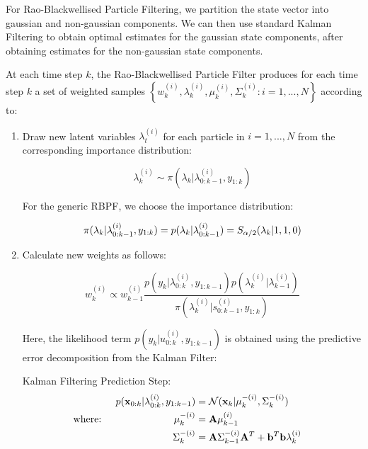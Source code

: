 \documentclass[../main.tex]{subfiles}
\begin{document}
For Rao-Blackwellised Particle Filtering, we partition the state vector into gaussian and non-gaussian components. We can then use standard Kalman Filtering to obtain optimal estimates for the gaussian state components, after obtaining estimates for the non-gaussian state components.  


At each time step $k$, the Rao-Blackwellised Particle Filter produces for each time step $k$ a set of weighted samples $\left\{ w_k^{(i)}, \lambda_k^{(i)}, \mu_k^{(i)}, \Sigma_k^{(i)} : i = 1,...,N \right\}$ according to: 


\begin{enumerate}
	\item Draw new latent variables $\lambda_t^{(i)}$ for each particle in $i = 1,...,N$ from the corresponding importance distribution: 
	
	\begin{equation}
		\lambda_k^{(i)} \sim \pi(\lambda_k | \lambda_{0:k-1}^{(i)}, y_{1:k})
	\end{equation}
	
	For the generic RBPF, we choose the importance distribution: 
	
	\begin{equation}
		\pi(\lambda_k | \lambda_{0:k-1}^{(i)}, y_{1:k}) = p(\lambda_k | \lambda_{0:k-1}^{(i)}) = S_{\alpha/2}(\lambda_k | 1, 1, 0)
		\label{eq:2__2__2__RBPF_importance_dist}
	\end{equation}
	
	\item Calculate new weights as follows:
	
	\begin{equation}
		w_k^{(i)} \propto w_{k-1}^{(i)} \frac{p(y_k | \lambda_{0:k}^{(i)}, y_{1:k-1}) p(\lambda_k^{(i)} | \lambda_{k-1}^{(i)})}{\pi(\lambda_k^{(i)} | s_{0:k-1}^{(i)}, y_{1:k})}
	\end{equation}
	
	Here, the likelihood term $p(y_k | u_{0:k}^{(i)}, y_{1:k-1})$ is obtained using the predictive error decomposition from the Kalman Filter:
	
	Kalman Filtering Prediction Step: 
	\begin{align}
		& & p({\bf x}_{0:k} | \lambda_{0:k}^{(i)}, y_{1:k-1} ) &= \mathcal{N}({\bf x}_{k} | \mu_k^{-(i)}, \Sigma_k^{-(i)})&& \\
		& \text{where: } & \mu_k^{-(i)} &= {\bf A}\mu_{k-1}^{(i)}&& \notag\\
		& & \Sigma_k^{-(i)} & = {\bf A}\Sigma_{k-1}^{-(i)} {\bf A}^T + {\bf b}^T{\bf b} \lambda_{k}^{(i)}&& \notag
	\end{align}
	

\end{enumerate}
\end{document}

